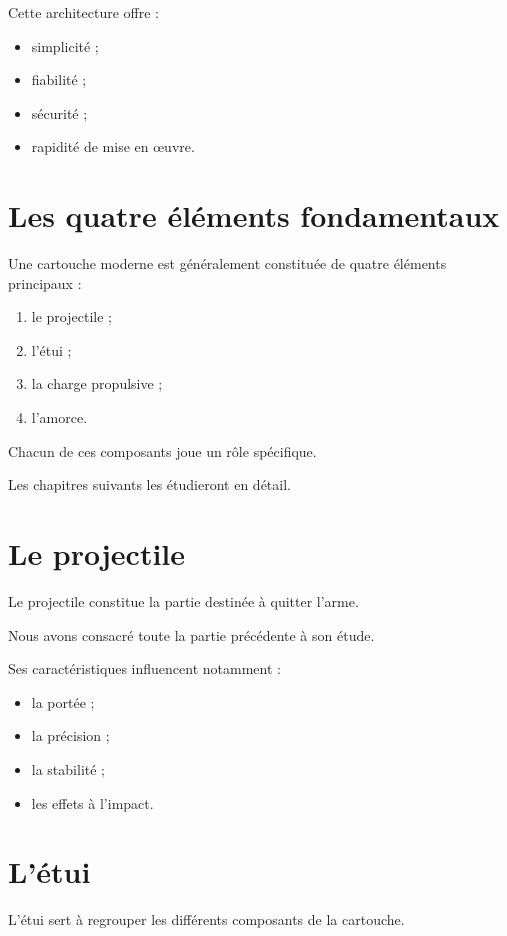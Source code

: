 Cette architecture offre :

\begin{itemize}
    \item simplicité ;
    \item fiabilité ;
    \item sécurité ;
    \item rapidité de mise en œuvre.
\end{itemize}

\section{Les quatre éléments fondamentaux}

Une cartouche moderne est généralement constituée de quatre éléments
principaux :

\begin{enumerate}
    \item le projectile ;
    \item l'étui ;
    \item la charge propulsive ;
    \item l'amorce.
\end{enumerate}

Chacun de ces composants joue un rôle spécifique.

Les chapitres suivants les étudieront en détail.

\section{Le projectile}

Le projectile constitue la partie destinée à quitter l'arme.

Nous avons consacré toute la partie précédente à son étude.

Ses caractéristiques influencent notamment :

\begin{itemize}
    \item la portée ;
    \item la précision ;
    \item la stabilité ;
    \item les effets à l'impact.
\end{itemize}

\section{L'étui}

L'étui sert à regrouper les différents composants de la cartouche.

